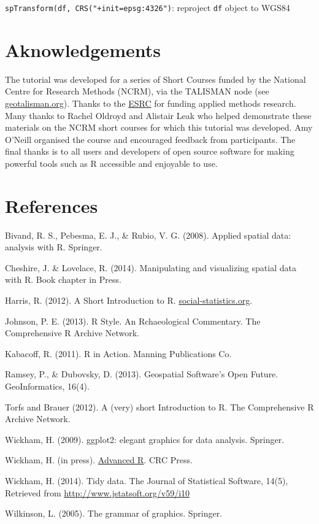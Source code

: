 \documentclass[]{article}
\begin{document}
\texttt{spTransform(df, CRS("+init=epsg:4326")}: reproject \texttt{df}
object to WGS84

\section{Aknowledgements}\label{aknowledgements}

The tutorial was developed for a series of Short Courses funded by the
National Centre for Research Methods (NCRM), via the TALISMAN node (see
\href{http://www.geotalisman.org/}{geotalisman.org}). Thanks to the
\href{http://www.esrc.ac.uk/}{ESRC} for funding applied methods
research. Many thanks to Rachel Oldroyd and Alistair Leak who helped
demonstrate these materials on the NCRM short courses for which this
tutorial was developed. Amy O'Neill organised the course and encouraged
feedback from participants. The final thanks is to all users and
developers of open source software for making powerful tools such as R
accessible and enjoyable to use.

\section{References}\label{references}

Bivand, R. S., Pebesma, E. J., \& Rubio, V. G. (2008). Applied spatial
data: analysis with R. Springer.

Cheshire, J. \& Lovelace, R. (2014). Manipulating and visualizing
spatial data with R. Book chapter in Press.

Harris, R. (2012). A Short Introduction to R.
\href{http://www.social-statistics.org/}{social-statistics.org}.

Johnson, P. E. (2013). R Style. An Rchaeological Commentary. The
Comprehensive R Archive Network.

Kabacoff, R. (2011). R in Action. Manning Publications Co.

Ramsey, P., \& Dubovsky, D. (2013). Geospatial Software's Open Future.
GeoInformatics, 16(4).

Torfs and Brauer (2012). A (very) short Introduction to R. The
Comprehensive R Archive Network.

Wickham, H. (2009). ggplot2: elegant graphics for data analysis.
Springer.

Wickham, H. (in press). \href{http://adv-r.had.co.nz/}{Advanced R}. CRC
Press.

Wickham, H. (2014). Tidy data. The Journal of Statistical Software,
14(5), Retrieved from \url{http://www.jstatsoft.org/v59/i10}

Wilkinson, L. (2005). The grammar of graphics. Springer.
\end{document}
